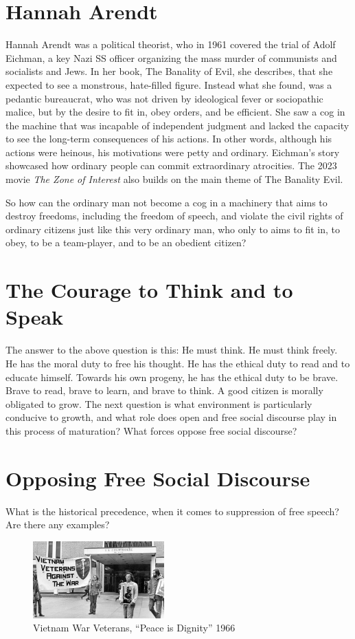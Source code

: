\documentclass[twoside,twocolumn]{article}
\begin{document}
\section*{Hannah Arendt}
Hannah Arendt was a political theorist,
who in 1961 covered the trial of Adolf Eichman, a key Nazi SS officer organizing
the mass murder of communists and socialists and Jews.
In her book, The Banality of Evil,
she describes, that she expected to see a monstrous, hate-filled figure.
Instead what she found, was a pedantic bureaucrat, who was not driven by ideological fever or sociopathic malice,
but by the desire to fit in, obey orders, and be efficient.
She saw a cog in the machine that was incapable of independent judgment and
lacked the capacity to see the long-term consequences of his actions.
In other words, although his actions were heinous, his motivations were petty and ordinary.
Eichman's story showcased how ordinary people can commit extraordinary atrocities.
The 2023 movie \textit{The Zone of Interest} also
builds on the main theme of The Banality Evil.

So how can the ordinary man not become a cog in a machinery
that aims to destroy freedoms, including the freedom of speech, and
violate the civil rights of ordinary citizens just like this very ordinary man,
who only to aims to fit in, to obey, to be a team-player, and to be an obedient citizen?

\section*{The Courage to Think and to Speak}
The answer to the above question is this:
He must think. He must think freely. He has the moral duty to free his thought.
He has the ethical duty to read and to educate himself.
Towards his own progeny, he has the ethical duty to be brave. Brave to read, brave to learn, and brave to think.
A good citizen is morally obligated to grow.
The next question is what environment is particularly conducive to growth,
and what role does open and free social discourse play in this process of maturation?
What forces oppose free social discourse?


\section*{Opposing Free Social Discourse}
What is the historical precedence, when it comes to suppression of free speech? Are there any examples?

\begin{figure}
\centering
  \includegraphics[width=0.45\textwidth]{i/vwv.jpg}
  \caption{Vietnam War Veterans, ``Peace is Dignity'' 1966
  }
\end{figure}
\end{document}
